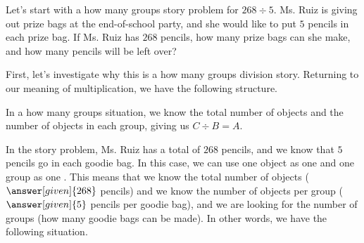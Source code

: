 \documentclass{ximera}
\begin{document}
\begin{example}
Let's start with a how many groups story problem for $268 \div 5$. Ms. Ruiz is giving out prize bags at the end-of-school party, and she would like to put $5$ pencils in each prize bag. If Ms. Ruiz has $268$ pencils, how many prize bags can she make, and how many pencils will be left over?

First, let's investigate why this is a how many groups division story. Returning to our meaning of multiplication, we have the following structure.
\begin{image}
\end{image}
In a how many groups situation, we know the total number of objects and the number of objects in each group, giving us $C \div B = A$.

\begin{image}
\end{image}
In the story problem, Ms. Ruiz has a total of $268$ pencils, and we know that $5$ pencils go in each goodie bag. In this case, we can use one object as one  and one group as one . This means that we know the total number of objects ($\answer[given]{268}$ pencils) and we know the number of objects per group ($\answer[given]{5}$ pencils per goodie bag), and we are looking for the number of groups (how many goodie bags can be made). In other words, we have the following situation.


\end{example}
\end{document}
